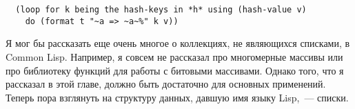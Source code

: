 \begin{lstlisting}  
  (loop for k being the hash-keys in *h* using (hash-value v)
    do (format t "~a => ~a~%" k v))
\end{lstlisting}

Я мог бы рассказать еще очень многое о коллекциях, не являющихся списками, в Common
Lisp.  Например, я совсем не рассказал про многомерные массивы или про библиотеку функций
для работы с битовыми массивами.  Однако того, что я рассказал в этой главе, должно быть
достаточно для основных применений.  Теперь пора взглянуть на
структуру данных, давшую имя языку Lisp,~--- списки.


